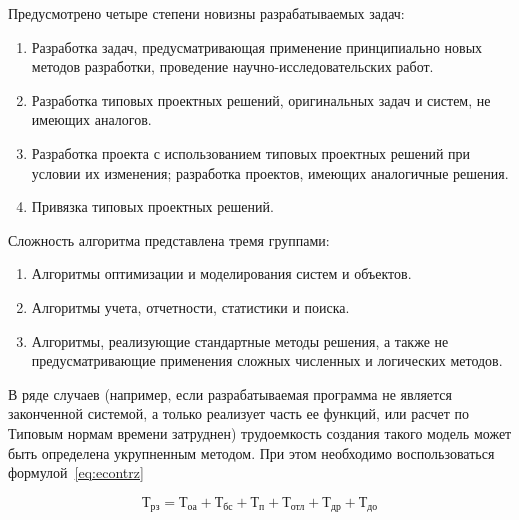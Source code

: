 Предусмотрено четыре степени новизны разрабатываемых задач:

\begin{enumerate}
    \item Разработка задач, предусматривающая применение принципиально новых методов разработки, проведение научно-исследовательских работ.
    \item Разработка типовых проектных решений, оригинальных задач и систем, не имеющих аналогов.
    \item Разработка проекта с использованием типовых проектных решений при условии их изменения; разработка проектов, имеющих аналогичные решения.
    \item Привязка типовых проектных решений.
\end{enumerate}

Сложность алгоритма представлена тремя группами:

\begin{enumerate}
    \item Алгоритмы оптимизации и моделирования систем и объектов.
    \item Алгоритмы учета, отчетности, статистики и поиска.
    \item Алгоритмы, реализующие стандартные методы решения, а также не предусматривающие применения сложных численных и логических методов.
\end{enumerate}

В ряде случаев (например, если разрабатываемая программа не является законченной системой, а только реализует часть ее функций, или расчет по Типовым нормам времени затруднен) трудоемкость создания такого модель может быть определена укрупненным методом. При этом необходимо воспользоваться формулой~\ref{eq:econtrz}

\begin{equation}
    \label{eq:econtrz}
    \textrm{Т}_\textrm{рз} = \textrm{Т}_\textrm{оа} + \textrm{Т}_\textrm{бс} + \textrm{Т}_\textrm{п} + \textrm{Т}_\textrm{отл} + \textrm{Т}_\textrm{др} + \textrm{Т}_\textrm{до}
\end{equation}
